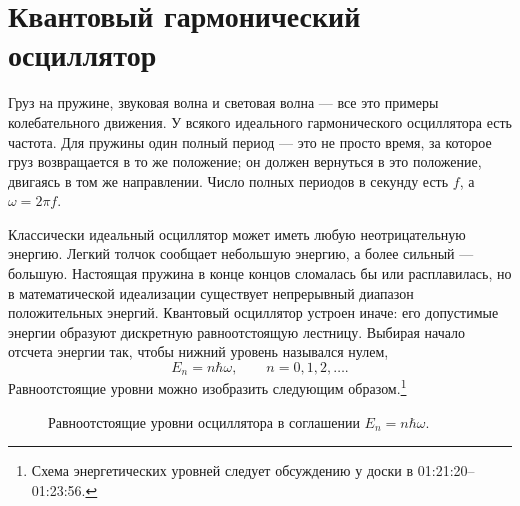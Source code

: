 \begin{classroomqa}
\end{classroomqa}

\section{Квантовый гармонический осциллятор}

Груз на пружине, звуковая волна и световая волна — все это примеры колебательного движения. У всякого идеального гармонического осциллятора есть частота. Для пружины один полный период — это не просто время, за которое груз возвращается в то же положение; он должен вернуться в это положение, двигаясь в том же направлении. Число полных периодов в секунду есть \(f\), а \(\omega=2\pi f\).

Классически идеальный осциллятор может иметь любую неотрицательную энергию. Легкий толчок сообщает небольшую энергию, а более сильный — большую. Настоящая пружина в конце концов сломалась бы или расплавилась, но в математической идеализации существует непрерывный диапазон положительных энергий. Квантовый осциллятор устроен иначе: его допустимые энергии образуют дискретную равноотстоящую лестницу. Выбирая начало отсчета энергии так, чтобы нижний уровень назывался нулем,
\begin{equation}
E_n=n\hbar\omega,
\qquad n=0,1,2,\ldots .
\end{equation}
Равноотстоящие уровни можно изобразить следующим образом.\footnote{Схема энергетических уровней следует обсуждению у доски в 01:21:20--01:23:56.}

\begin{figure}[t]
\centering
{}
\caption{Равноотстоящие уровни осциллятора в соглашении \(E_n=n\hbar\omega\).}
\end{figure}


